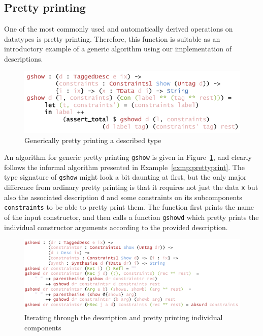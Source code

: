 \documentclass{ituthesis}
\newcommand{\ttdec}[1]{\textcolor{declared-var-color}{\texttt{#1}}}
\newcommand{\ttvar}[1]{\textcolor{local-var-color}{\texttt{#1}}}
\theoremstyle{break}
\begin{document}
\subsection{Pretty printing}
\label{sub:Pretty printing}
One of the most commonly used and automatically derived operations on datatypes is pretty printing.
Therefore, this function is suitable as an introductory example of a generic algorithm using our implementation of descriptions.

\begin{figure}[ht]
\begin{center}
    \includegraphics[scale=0.5]{Figures/GenericShow.png}
\end{center}
\caption{Generically pretty printing a described type}
\label{fig:showgen}
\end{figure}

An algorithm for generic pretty printing \ttdec{gshow} is given in Figure~\ref{fig:showgen}, and clearly follows the informal algorithm presented in Example~\ref{exmp:prettyprint}.
The type signature of \ttdec{gshow} might look a bit daunting at first, but the only major difference from ordinary pretty printing is that it requires not just the data \ttvar{x} but also the associated description \ttvar{d}
and some constraints on its subcomponents \ttvar{constraints} to be able to pretty print them.
The function first prints the name of the input constructor, and then calls a function \ttdec{gshowd} which pretty prints the individual constructor arguments according to the provided description.

\begin{figure}[ht]
\begin{center}
    \includegraphics[scale=0.5]{Figures/GenericShowDesc.png}
\end{center}
\caption{Iterating through the description and pretty printing individual components}
\label{fig:showgendesc}
\end{figure}
\end{document}

